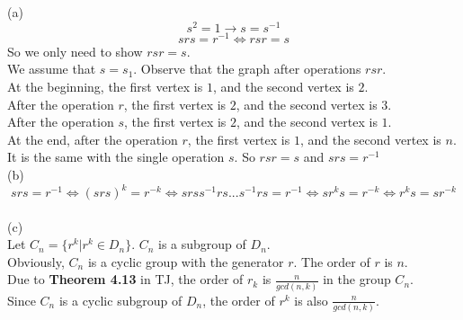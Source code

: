\documentclass[a4paper, justified]{tufte-handout}
\begin{document}
\begin{solution}
(a)\\
$$s^2=1\to s=s^{-1}$$
$$ srs = r^{-1}\Leftrightarrow rsr=s$$
So we only need to show $rsr=s$.\\
We assume that $s=s_1$. Observe that the graph after operations $rsr$.\\
At the beginning, the first vertex is $1$, and the second vertex is $2$.\\
After the operation $r$,  the first vertex is $2$, and the second vertex is $3$.\\
After the operation $s$,  the first vertex is $2$, and the second vertex is $1$.\\
At the end, after the operation $r$,  the first vertex is $1$, and the second vertex is $n$.\\
It is the same with the single operation $s$. So $rsr=s$ and $srs=r^{-1}$\\
(b)\\
$$ srs = r^{-1}\Leftrightarrow (srs)^k = r^{-k}\Leftrightarrow srss^{-1}rs...s^{-1}rs = r^{-1}\Leftrightarrow  sr^ks = r^{-k} \Leftrightarrow r^ks=sr^{-k}$$\\
(c)\\
Let $C_n=\{r^{k} | r^{k}\in D_n\}$. $C_n$ is a subgroup of $D_n$.\\
Obviously, $C_n$ is a cyclic group with the generator $r$. The order of $r$ is $n$.\\
Due to \textbf{Theorem 4.13} in TJ, the order of $r_k$ is $\frac{n}{gcd(n,k)}$ in the group $C_n$.\\
Since $C_n$ is a cyclic subgroup of $D_n$, the order of $r^k$ is also $\frac{n}{gcd(n,k)}$.
\end{solution}

\begin{problem}
\end{problem}
\end{document}
